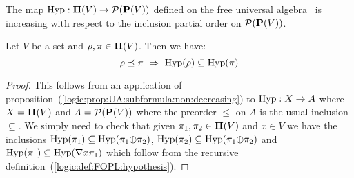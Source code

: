 The map $\mbox{\rm Hyp}:\mbox{${\bf\Pi}(V)$}\to{\cal P}(\mbox{${\bf P}(V)$})$ defined on the free universal
algebra \pvs\ is increasing with respect to the inclusion partial
order on ${\cal P}(\mbox{${\bf P}(V)$})$.
\begin{prop}\label{logic:prop:FUAP:hypothesis:subformula}
Let $V$ be a set and $\rho,\pi\in\mbox{${\bf\Pi}(V)$}$. Then we have:
    \[
    \rho\preceq\pi\ \Rightarrow\ \hyp(\rho)\subseteq\hyp(\pi)
    \]
\end{prop}
\begin{proof}
This follows from an application of
proposition~(\ref{logic:prop:UA:subformula:non:decreasing}) to
$\mbox{\rm Hyp}:X\to A$ where $X=\mbox{${\bf\Pi}(V)$}$ and $A={\cal P}(\mbox{${\bf P}(V)$})$ where the
preorder $\leq$ on $A$ is the usual inclusion $\subseteq$. We simply
need to check that given $\pi_{1},\pi_{2}\in\mbox{${\bf\Pi}(V)$}$ and $x\in V$ we
have the inclusions
$\mbox{\rm Hyp}(\pi_{1})\subseteq\mbox{\rm Hyp}(\pi_{1}\mbox{$\oplus$}\pi_{2})$,
$\mbox{\rm Hyp}(\pi_{2})\subseteq\mbox{\rm Hyp}(\pi_{1}\mbox{$\oplus$}\pi_{2})$ and
$\mbox{\rm Hyp}(\pi_{1})\subseteq\mbox{\rm Hyp}(\mbox{$\nabla$} x\pi_{1})$ which follow from the
recursive definition~(\ref{logic:def:FOPL:hypothesis}).
\end{proof}

